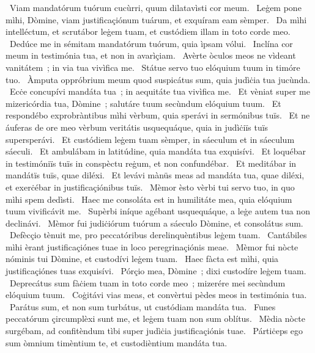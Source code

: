 {~Viam mandatórum tuórum cucùrri, quum dilatavìsti cor meum. 
~Leġem pone mìhi, Dòmine, viam justificaçiónum tuárum, et exquíram eam sèmper. 
~Da mìhi intelléctum, et scrutábor leġem tuam, et custódiem illam in toto corde meo. 
~Dedúce me in sémitam mandatórum tuórum, quia ìpsam vólui. 
~Inclína cor meum in testimónia tua, et non in avarìçiam. 
~Avèrte òculos meos ne vìdeant vanitátem~; in via tua vivìfica me. 
~Státue servo tuo elóquium tuum in timóre tuo. 
~Àmputa oppróbrium meum quod suspicátus sum, quia judìċia tua jucùnda. 
~Ecċe concupívi mandáta tua~; in aequitáte tua vivìfica me. 
~Et vèniat super me mizericórdia tua, Dòmine~; salutáre tuum secùndum elóquium tuum. 
~Et respondébo exprobràntibus mìhi vèrbum, quia sperávi in sermónibus tuïs. 
~Et ne áuferas de ore meo vèrbum veritátis usquequáque, quia in judìċiïs tuïs supersperávi. 
~Et custódiem leġem tuam sèmper, in sáeculum et in sáeculum sáeculi. 
~Et ambulábam in latitúdine, quia mandáta tua exquisívi. 
~Et loquébar in testimóniïs tuïs in conspèctu reġum, et non confundébar. 
~Et meditábar in mandátïs tuïs, quae diléxi. 
~Et levávi mànüs meas ad mandáta tua, quae diléxi, et exerċébar in justificaçiónibus tuïs. 
~Mèmor èsto vèrbi tui servo tuo, in quo mìhi spem dedìsti. 
~Haec me consoláta est in humilitáte mea, quia elóquium tuum vivificávit me. 
~Supèrbi iníque agébant usquequáque, a leġe autem tua non declinávi. 
~Mèmor fui judiċiórum tuórum a sáeculo Dòmine, et consolátus sum. 
~Defècçio tènuit me, pro peccatóribus derelinquèntibus leġem tuam. 
~Cantábiles mìhi èrant justificaçiónes tuae in loco peregrinaçiónis meae. 
~Mèmor fui nòcte nóminis tui Dòmine, et custodívi leġem tuam. 
~Haec fàcta est mìhi, quia justificaçiónes tuas exquisívi. 
~Pórçio mea, Dòmine~; dixi custodíre leġem tuam. 
~Deprecátus sum fàċiem tuam in toto corde meo~; mizerére mei secùndum elóquium tuum. 
~Coġitávi vias meas, et convèrtui pèdes meos in testimónia tua. 
~Parátus sum, et non sum turbátus, ut custódiam mandáta tua. 
~Funes peccatórum çircumplèxi sunt me, et leġem tuam non sum oblítus. 
~Mèdia nòcte surgébam, ad confitèndum tìbi super judìċia justificaçiónis tuae. 
~Pártiċeps ego sum òmnium timèntium te, et custodièntium mandáta tua. 
}

